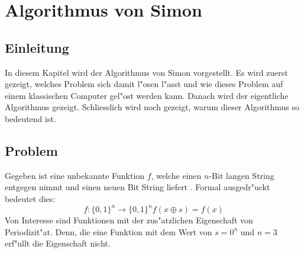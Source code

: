 \chapter{Algorithmus von Simon\label{chapter:simon}} 
\begin{refsection} 

\section{Einleitung} 
In diesem Kapitel wird der Algorithmus von Simon vorgestellt.  Es wird zuerst
gezeigt, welches Problem sich damit l"osen l"asst und wie dieses Problem auf
einem klassischen Computer gel"ost werden kann. Danach wird der eigentliche
Algorithmus gezeigt. Schliesslich wird noch gezeigt, warum dieser Algorithmus so
bedeutend ist.
\section{Problem} 
Gegeben ist eine unbekannte Funktion $f$, welche einen $n$-Bit langen String
entgegen nimmt und einen neuen Bit String liefert
\cite{simon:cse599d-dave-bacon}. Formal ausgedr"uckt bedeutet
dies:
\[
    f\colon\{0,1\}^n\to\{0,1\}^n
    f(x \oplus s) = f(x)
\]
Von Interesse sind Funktionen mit der zus"atzlichen Eigenschaft von
Periodizit"at.
Denn, die eine Funktion mit dem Wert von $s = 0^n$ und $n = 3$ erf"ullt die
Eigenschaft nicht.
\begin{figure}[H]
 \centering
\end{figure}
\end{refsection}
